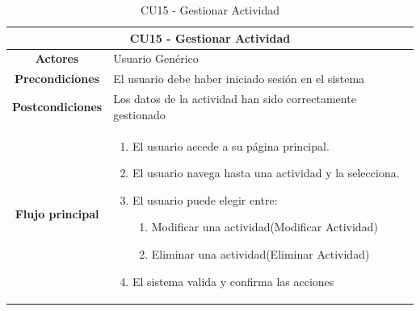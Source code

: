 \begin{table}[h]
    \centering
    \begin{tabular}{|c|p{10cm}|}
        \hline
        \multicolumn{2}{|c|}{\textbf{CU15 - Gestionar Actividad}}                              \\
        \hline
        \textbf{Actores}         & Usuario Genérico                                            \\
        \hline
        \textbf{Precondiciones}  & El usuario debe haber iniciado sesión en el sistema         \\
        \hline
        \textbf{Postcondiciones} & Los datos de la actividad han sido correctamente gestionado \\
        \hline
        \textbf{Flujo principal} & \begin{enumerate}
                                       \item El usuario accede a su página principal.
                                       \item El usuario navega hasta una actividad y la selecciona.
                                       \item El usuario puede elegir entre:
                                             \begin{enumerate}
                      \item Modificar una actividad(Modificar Actividad)
                      \item Eliminar una actividad(Eliminar Actividad)
                  \end{enumerate}
                                       \item El sistema valida y confirma las acciones
                                   \end{enumerate} \\
        \hline
    \end{tabular}
    \caption{CU15 - Gestionar Actividad }
\end{table}


